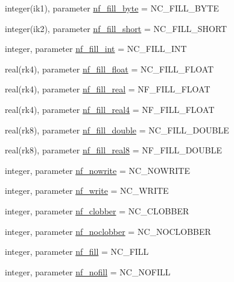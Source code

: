 \begin{DoxyCompactItemize}
integer(ik1), parameter \hyperlink{namespacenetcdf__nf__data_a2a64867aa9d38a8ff5cbd606ef0478f8}{nf\+\_\+fill\+\_\+byte} = N\+C\+\_\+\+F\+I\+L\+L\+\_\+\+B\+Y\+TE
\item 
integer(ik2), parameter \hyperlink{namespacenetcdf__nf__data_a0f1e22d1d4d770f9f38bdbdb033b141a}{nf\+\_\+fill\+\_\+short} = N\+C\+\_\+\+F\+I\+L\+L\+\_\+\+S\+H\+O\+RT
\item 
integer, parameter \hyperlink{namespacenetcdf__nf__data_ab1f2a07e7f49cc04285b82c9171156a3}{nf\+\_\+fill\+\_\+int} = N\+C\+\_\+\+F\+I\+L\+L\+\_\+\+I\+NT
\item 
real(rk4), parameter \hyperlink{namespacenetcdf__nf__data_a45481fe25da439752c00577a5621f3af}{nf\+\_\+fill\+\_\+float} = N\+C\+\_\+\+F\+I\+L\+L\+\_\+\+F\+L\+O\+AT
\item 
real(rk4), parameter \hyperlink{namespacenetcdf__nf__data_a216255093ca5242a39b018756c753fc8}{nf\+\_\+fill\+\_\+real} = N\+F\+\_\+\+F\+I\+L\+L\+\_\+\+F\+L\+O\+AT
\item 
real(rk4), parameter \hyperlink{namespacenetcdf__nf__data_ab3b3657f41dac420f28e0801a42050e2}{nf\+\_\+fill\+\_\+real4} = N\+F\+\_\+\+F\+I\+L\+L\+\_\+\+F\+L\+O\+AT
\item 
real(rk8), parameter \hyperlink{namespacenetcdf__nf__data_a80163a1522a8aefe8dad549a90ca70f3}{nf\+\_\+fill\+\_\+double} = N\+C\+\_\+\+F\+I\+L\+L\+\_\+\+D\+O\+U\+B\+LE
\item 
real(rk8), parameter \hyperlink{namespacenetcdf__nf__data_a646a4d0f62d4fd9e6003de6054e2dd0e}{nf\+\_\+fill\+\_\+real8} = N\+F\+\_\+\+F\+I\+L\+L\+\_\+\+D\+O\+U\+B\+LE
\item 
integer, parameter \hyperlink{namespacenetcdf__nf__data_a9ce94f6db387c6d8dbb4b42b50c99b41}{nf\+\_\+nowrite} = N\+C\+\_\+\+N\+O\+W\+R\+I\+TE
\item 
integer, parameter \hyperlink{namespacenetcdf__nf__data_aaf3fef826de5a81142ab319ef0ed0539}{nf\+\_\+write} = N\+C\+\_\+\+W\+R\+I\+TE
\item 
integer, parameter \hyperlink{namespacenetcdf__nf__data_abfbd39871ccb74577973ce9332bf3a73}{nf\+\_\+clobber} = N\+C\+\_\+\+C\+L\+O\+B\+B\+ER
\item 
integer, parameter \hyperlink{namespacenetcdf__nf__data_a120c58276f557cff3cca645c7bd34e07}{nf\+\_\+noclobber} = N\+C\+\_\+\+N\+O\+C\+L\+O\+B\+B\+ER
\item 
integer, parameter \hyperlink{namespacenetcdf__nf__data_a45554206e759ae606aa467504278f3bc}{nf\+\_\+fill} = N\+C\+\_\+\+F\+I\+LL
\item 
integer, parameter \hyperlink{namespacenetcdf__nf__data_aab3e7634197ed5d40c4710579d794c98}{nf\+\_\+nofill} = N\+C\+\_\+\+N\+O\+F\+I\+LL

\end{DoxyCompactItemize}
